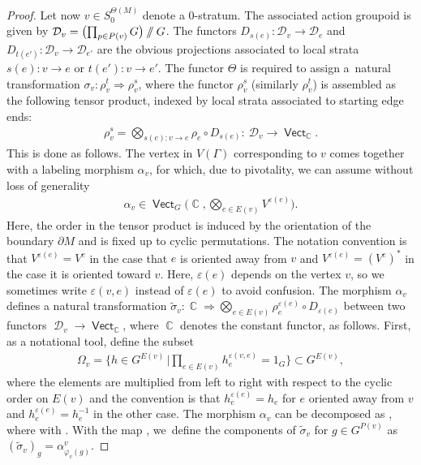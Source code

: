 \documentclass[pdftex]{sigma}
\DeclareMathOperator{\vect}{\mathsf{Vect}}
\DeclareMathOperator{\C}{\mathbb{C}}
\DeclareMathOperator{\cald}{\mathcal{D}}
\newcommand{\sslash}{\mathbin{/\mkern-6mu/}}
\numberwithin{equation}{section}
\theoremstyle{definition}
\begin{document}
\begin{proof}
 Let now $v \in S_0^{\Theta(M)}$ denote a 0-stratum. The associated action groupoid is given by $\mathcal{D}_v = \bigl(\prod_{p \in P(v)}G\bigr) \sslash G$. The functors $D_{s(e)}\colon \mathcal{D}_{v} \rightarrow \mathcal{D}_e$ and $D_{t(e')}\colon \mathcal{D}_{v} \rightarrow \mathcal{D}_{e'}$ are the obvious projections associated to local strata $s(e)\colon v \rightarrow e$ or $t(e')\colon v \rightarrow e'$. The functor $\Theta$ is required to assign a~natural transformation $\sigma_v\colon \rho_v^t \Rightarrow \rho_v^s$, where the functor $\rho_v^s$ (similarly $\rho_v^t$) is assembled as the following tensor product, indexed by local strata associated to starting edge ends:
 \begin{align*}
 \rho_v^s = \bigotimes_{s(e)\colon v \rightarrow e}\rho_e \circ D_{s(e)}\colon \ \mathcal{D}_v \rightarrow \vect_{\C}.
 \end{align*}
 This is done as follows. The vertex in $V(\Gamma)$ corresponding to $v$ comes together with a labeling morphism $\alpha_v$, for which, due to pivotality, we can assume without loss of generality
 \begin{align*}
 \alpha_v \in \vect_G\biggl(\C, \bigotimes_{e \in E(v)}V^{\varepsilon(e)}\biggr).
 \end{align*}
 Here, the order in the tensor product is induced by the orientation of the boundary $\partial M$ and is fixed up to cyclic permutations. The notation convention is that $V^{\varepsilon(e)} = V^e$ in the case that $e$ is oriented away from $v$ and $V^{\varepsilon(e)} = (V^e)^*$ in the case it is oriented toward $v$. Here, $\varepsilon(e)$ depends on the vertex $v$, so we sometimes write $\varepsilon(v, e)$ instead of $\varepsilon(e)$ to avoid confusion.
 The morphism $\alpha_v$ defines a natural transformation $\widetilde{\sigma}_v\colon \C \Rightarrow \bigotimes_{e \in E(v)} \rho_e^{\varepsilon(e)}\circ D_{\varepsilon(e)}$ between two functors $\cald_v \rightarrow \vect_{\C}$, where $\C$ denotes the constant functor, as follows. First, as a notational tool, define the subset
 \begin{align*}
 \Omega_v = \bigg\{h \in G^{E(v)} \, \bigg| \prod_{e \in E(v)}h_e^{\varepsilon(v, e)} = 1_G \bigg\} \subset G^{E(v)},
 \end{align*}
 where the elements are multiplied from left to right with respect to the cyclic order on $E(v)$ and the convention is that $h_e^{\varepsilon(e)} = h_e$ for $e$ oriented away from $v$ and $h_e^{\varepsilon(e)} = h_e^{-1}$ in the other case. The morphism $\alpha_v$ can be decomposed as , where \smash{$\alpha_h^v\colon \C \rightarrow \bigotimes_{e \in E(v)} \bigl(V_{h_e}^e \bigr)^{\varepsilon(e)}$} with . With the map , we~define the components of $\widetilde{\sigma}_v$ for $g \in G^{P(v)}$ as $(\widetilde{\sigma}_v)_g = \alpha_{\varphi_v(g)}^v$.

\end{proof}
\end{document}
